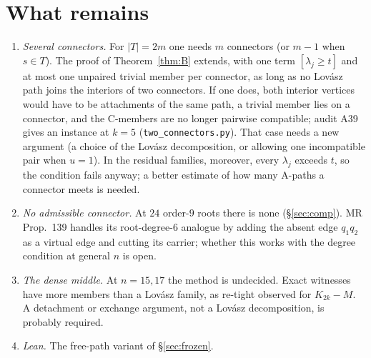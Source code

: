 \documentclass[11pt]{amsart}
\theoremstyle{definition}
\begin{document}
\section{What remains}\label{sec:open}
\begin{enumerate}[leftmargin=*]
\item \emph{Several connectors.} For $|T|=2m$ one needs $m$ connectors (or $m-1$ when $s\in T$). The
proof of Theorem~\ref{thm:B} extends, with one term $[\lambda_j\ge t]$ and at most one unpaired trivial
member per connector, as long as no Lov\'asz path joins the interiors of two connectors. If one does,
both interior vertices would have to be attachments of the same path, a trivial member lies on a
connector, and the C-members are no longer pairwise compatible; audit A39 gives an instance at $k=5$
(\texttt{two\_connectors.py}). That case needs a new argument (a choice of the Lov\'asz decomposition,
or allowing one incompatible pair when $u=1$). In the residual families, moreover, every $\lambda_j$
exceeds $t$, so the condition fails anyway; a better estimate of how many A-paths a connector meets is
needed.
\item \emph{No admissible connector.} At $24$ order-$9$ roots there is none (\S\ref{sec:comp}). MR
Prop.~139 handles its root-degree-$6$ analogue by adding the absent edge $q_1q_2$ as a virtual edge and
cutting its carrier; whether this works with the degree condition at general $n$ is open.
\item \emph{The dense middle.} At $n=15,17$ the method is undecided. Exact witnesses have more members
than a Lov\'asz family, as re-tight observed for $K_{2k}-M$. A detachment or exchange argument, not a
Lov\'asz decomposition, is probably required.
\item \emph{Lean.} The free-path variant of \S\ref{sec:frozen}.
\end{enumerate}
\end{document}
